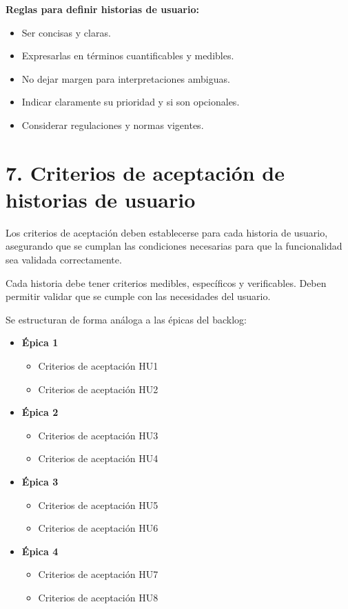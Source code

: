 \documentclass[
11pt, %
]{charter}
\begin{document}
\textbf{Reglas para definir historias de usuario:}
\begin{itemize}
  \item Ser concisas y claras.
  \item Expresarlas en términos cuantificables y medibles.
  \item No dejar margen para interpretaciones ambiguas.
  \item Indicar claramente su prioridad y si son opcionales.
  \item Considerar regulaciones y normas vigentes.
\end{itemize}

\section{7. Criterios de aceptación de historias de usuario}
\label{sec:criteriosAceptacion}

Los criterios de aceptación deben establecerse para cada historia de usuario, asegurando que se cumplan las condiciones necesarias para que la funcionalidad sea validada correctamente.

Cada historia debe tener criterios medibles, específicos y verificables. Deben permitir validar que se cumple con las necesidades del usuario.

Se estructuran de forma análoga a las \'{e}picas del backlog:

\begin{itemize}
  \item \textbf{\'{E}pica 1}
    \begin{itemize}
      \item Criterios de aceptación HU1
      \item Criterios de aceptación HU2
    \end{itemize}
  \item \textbf{\'{E}pica 2}
    \begin{itemize}
      \item Criterios de aceptación HU3
      \item Criterios de aceptación HU4
    \end{itemize}
  \item \textbf{\'{E}pica 3}
    \begin{itemize}
      \item Criterios de aceptación HU5
      \item Criterios de aceptación HU6
    \end{itemize}
  \item \textbf{\'{E}pica 4}
    \begin{itemize}
      \item Criterios de aceptación HU7
      \item Criterios de aceptación HU8
    \end{itemize}
\end{itemize}
\end{document}
